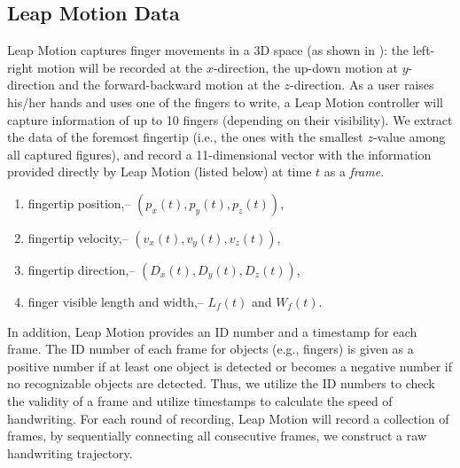 \subsection{Leap Motion Data}
Leap Motion captures finger movements in a 3D space (as shown in ):  the left-right motion will be recorded at the $x$-direction, the up-down motion at $y$-direction and the forward-backward motion at the $z$-direction. 
As a user raises his/her hands and uses one of the fingers to write,  a Leap Motion controller will capture information of up to 10 fingers (depending on their visibility). We extract the data of the foremost fingertip (i.e., the ones with the smallest $z$-value among all captured figures), and record a 11-dimensional vector with the information provided directly by Leap Motion (listed below) at time $t$ as a \textit{frame}.  
\begin{enumerate}
\setlength{\itemsep}{-0.5mm}
\item fingertip position,\quad -- $(p_x(t), p_y(t),p_z(t))$, 
\item fingertip velocity,\quad -- $(v_x(t), v_y(t),v_z(t))$, 
\item fingertip direction,\quad -- $(D_x(t), D_y(t),D_z(t))$, 
\item finger visible length and width,\quad -- $L_f(t)$ and $W_f(t)$. 
\end{enumerate}
In addition, Leap Motion provides an ID number and a timestamp for each frame. The ID number of each frame for objects (e.g., fingers) is given as a positive number if at least one object is detected or becomes a negative number if no recognizable objects are detected. Thus, we utilize the ID numbers to check the validity of a frame and utilize timestamps to calculate the speed of handwriting. 
For each round of recording, Leap Motion will record a collection of  frames, by sequentially connecting all consecutive frames, we construct a raw handwriting trajectory.  




